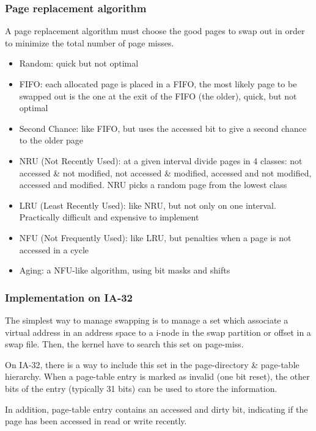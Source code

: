 \begin{frame}
  \frametitle{Page replacement algorithm}

  A page replacement algorithm must choose the good pages to swap out
  in order to minimize the total number of page misses.

  \-

  \begin{itemize}
  \item
    Random: quick but not optimal
  \item
    FIFO: each allocated page is placed in a FIFO, the most likely
    page to be swapped out is the one at the exit of the FIFO (the
    older), quick, but not optimal
  \item
    Second Chance: like FIFO, but uses the accessed bit to give a
    second chance to the older page
  \item
    NRU (Not Recently Used): at a given interval divide pages in 4
    classes: not accessed \& not modified, not accessed \& modified,
    accessed and not modified, accessed and modified. NRU picks a
    random page from the lowest class
  \item
    LRU (Least Recently Used): like NRU, but not only on one
    interval. Practically difficult and expensive to implement
  \item
    NFU (Not Frequently Used): like LRU, but penalties when a page is
    not accessed in a cycle
  \item
    Aging: a NFU-like algorithm, using bit masks and shifts
  \end{itemize}

\end{frame}


\begin{frame}
  \frametitle{Implementation on IA-32}

  The simplest way to manage swapping is to manage a set which
  associate a virtual address in an address space to a i-node in the
  swap partition or offset in a swap file. Then, the kernel have to
  search this set on page-miss.

  \-

  On IA-32, there is a way to include this set in the page-directory
  \& page-table hierarchy. When a page-table entry is marked as
  invalid (one bit reset), the other bits of the entry (typically 31
  bits) can be used to store the information.

  \-

  In addition, page-table entry contains an accessed and dirty bit,
  indicating if the page has been accessed in read or write recently.

\end{frame}

